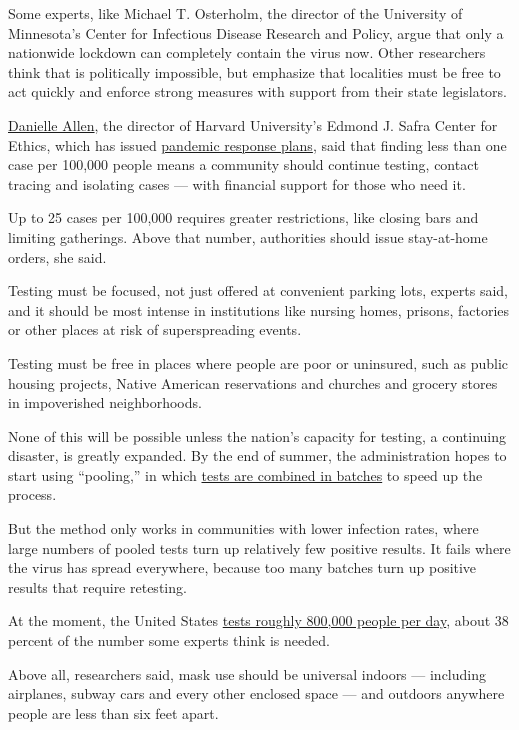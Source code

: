Some experts, like Michael T. Osterholm, the director of the University
of Minnesota's Center for Infectious Disease Research and Policy, argue
that only a nationwide lockdown can completely contain the virus now.
Other researchers think that is politically impossible, but emphasize
that localities must be free to act quickly and enforce strong measures
with support from their state legislators.

\href{https://scholar.harvard.edu/danielleallen/home}{Danielle Allen},
the director of Harvard University's Edmond J. Safra Center for Ethics,
which has issued
\href{https://ethics.harvard.edu/news/path-zero-key-metrics}{pandemic
response plans}, said that finding less than one case per 100,000 people
means a community should continue testing, contact tracing and isolating
cases --- with financial support for those who need it.

Up to 25 cases per 100,000 requires greater restrictions, like closing
bars and limiting gatherings. Above that number, authorities should
issue stay-at-home orders, she said.

Testing must be focused, not just offered at convenient parking lots,
experts said, and it should be most intense in institutions like nursing
homes, prisons, factories or other places at risk of superspreading
events.

Testing must be free in places where people are poor or uninsured, such
as public housing projects, Native American reservations and churches
and grocery stores in impoverished neighborhoods.

None of this will be possible unless the nation's capacity for testing,
a continuing disaster, is greatly expanded. By the end of summer, the
administration hopes to start using ``pooling,'' in which
\href{https://www.nytimes3xbfgragh.onion/2020/07/01/health/coronavirus-pooled-testing.html}{tests
are combined in batches} to speed up the process.

But the method only works in communities with lower infection rates,
where large numbers of pooled tests turn up relatively few positive
results. It fails where the virus has spread everywhere, because too
many batches turn up positive results that require retesting.

At the moment, the United States
\href{https://www.nytimes3xbfgragh.onion/interactive/2020/us/coronavirus-testing.html}{tests
roughly 800,000 people per day}, about 38 percent of the number some
experts think is needed.

Above all, researchers said, mask use should be universal indoors ---
including airplanes, subway cars and every other enclosed space --- and
outdoors anywhere people are less than six feet apart.

